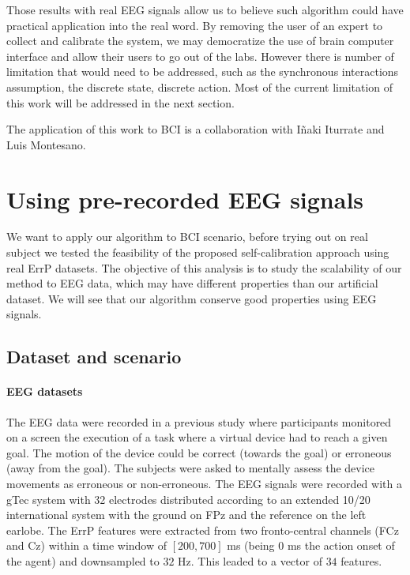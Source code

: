 Those results with real EEG signals allow us to believe such algorithm could have practical application into the real word. By removing the user of an expert to collect and calibrate the system, we may democratize the use of brain computer interface and allow their users to go out of the labs. However there is number of limitation that would need to be addressed, such as the synchronous interactions assumption, the discrete state, discrete action. Most of the current limitation of this work will be addressed in the next section.

The application of this work to BCI is a collaboration with I{\~n}aki Iturrate and Luis Montesano.

\section{Using pre-recorded EEG signals}
\label{chapter:bci:EEGsignals}

We want to apply our algorithm to BCI scenario, before trying out on real subject we tested the feasibility of the proposed self-calibration approach using real ErrP datasets. The objective of this analysis is to study the scalability of our method to EEG data, which may have different properties than our artificial dataset. We will see that our algorithm conserve good properties using EEG signals.

\subsection{Dataset and scenario}

\paragraph{EEG datasets}  The EEG data were recorded in a previous study \cite{iturrate2013task} where participants monitored on a screen the execution of a task where a virtual device had to reach a given goal. The motion of the device could be correct (towards the goal) or erroneous (away from the goal). The subjects were asked to mentally assess the device movements as erroneous or non-erroneous. The EEG signals were recorded with a gTec system with 32 electrodes distributed according to an extended 10/20 international system with the ground on FPz and the reference on the left earlobe. The ErrP features were extracted from two fronto-central channels (FCz and Cz) within a time window of $[200,700]$ ms (being 0 ms the action onset of the agent) and downsampled to $32$ Hz. This leaded to a vector of $34$ features.


